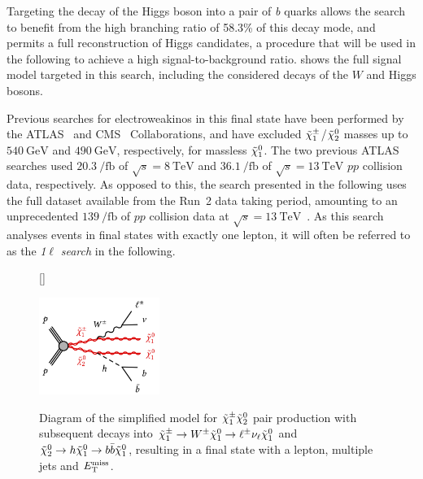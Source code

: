 Targeting the decay of the Higgs boson into a pair of \textit{b} quarks allows the search to benefit from the high branching ratio of 58.3\% of this decay mode, and permits a full reconstruction of Higgs candidates, a procedure that will be used in the following to achieve a high signal-to-background ratio.
 shows the full signal model targeted in this search, including the considered decays of the $W$ and Higgs bosons. 

Previous searches for electroweakinos in this final state have been performed by the \mbox{ATLAS}~\cite{SUSY-2013-23,SUSY-2017-01} and CMS~\cite{CMS-SUS-16-043} Collaborations, and have excluded $\tilde{\chi}_1^\pm$/$\tilde{\chi}_2^0$ masses up to $\SI{540}{\GeV}$ and $\SI{490}{\GeV}$, respectively, for massless $\tilde{\chi}_1^0$.
The two previous ATLAS searches used $\SI{20.3}{\per\femto\barn}$ of $\sqrt{s}=\SI{8}{\TeV}$ and $\SI{36.1}{\per\femto\barn}$ of $\sqrt{s}=\SI{13}{\TeV}$ $pp$ collision data, respectively.
As opposed to this, the search presented in the following uses the full dataset available from the Run~2 data taking period, amounting to an unprecedented $\SI{139}{\per\femto\barn}$ of $pp$ collision data at $\sqrt{s}=\SI{13}{\TeV}$~\cite{SUSY-2019-08}.
As this search analyses events in final states with exactly one lepton, it will often be referred to as the \textit{1}$\ell$ \textit{search} in the following.


\begin{figure}
[\FBwidth]
{\caption{Diagram of the simplified model for $\tilde{\chi}_1^\pm\tilde{\chi}_2^0$ pair production with subsequent decays into $\tilde{\chi}_1^\pm\rightarrow W^\pm\tilde{\chi}_1^0 \to \ell^\pm\nu_\ell\tilde{\chi}_1^0$ and $\tilde{\chi}_2^0\rightarrow h\tilde{\chi}_1^0 \to b\bar{b}\tilde{\chi}_1^0$, resulting in a final state with a lepton, multiple jets and $E_{\textrm{T}}^{\textrm{miss}}$.}\label{fig:Wh_model_full}}
{\includegraphics[width=0.35\textwidth]{c1n2_wh_1lbb.png}}
\end{figure}

